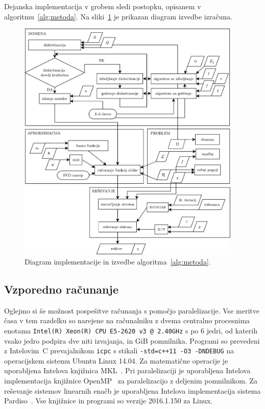 \documentclass[12pt,a4paper,twoside]{article}
\theoremstyle{definition} %
\theoremstyle{plain} %
\numberwithin{equation}{section}
\newcommand{\CC}{C\nolinebreak\hspace{-.05em}\raisebox{.4ex}{\tiny\bf +}\nolinebreak\hspace{-.10em}\raisebox{.4ex}{\tiny\bf +}}
\begin{document}
Dejanska implementacija v grobem sledi postopku, opisanem v algoritmu~\ref{alg:metoda}. Na
sliki~\ref{fig:implementacija} je prikazan diagram izvedbe izračuna.

\begin{figure}[!h]
  \centering
  \vspace{-2ex}
  \includegraphics[width=0.95\textwidth]{images/diagram_finished.pdf}
  \vspace{-1ex}
  \caption[Diagram implementacije in izvedbe MLSM]{Diagram implementacije in
  izvedbe algoritma~\ref{alg:metoda}.}
  \label{fig:implementacija}
  \vspace{-5ex}
\end{figure}

\subsection{Vzporedno računanje}
Oglejmo si še možnost pospešitve računanja s pomočjo paralelizacije.
Vse meritve časa v tem razdelku so narejene na računalniku z dvema centralno procesnima enotama
\texttt{Intel(R) Xeon(R) CPU E5-2620 v3 @ 2.40GHz} s po 6 jedri, od katerih vsako jedro podpira dve
niti izvajanja, in \unit[64]{GiB} pomnilnika. Programi so prevedeni z Intelovim~\CC{}
prevajalnikom \texttt{icpc}  s stikali \texttt{-std=c++11 -O3 -DNDEBUG}
na operacijskem sistemu Ubuntu Linux 14.04. Za matematične operacije je uporabljena Intelova
knjižnica MKL~\cite{mkl}. Pri paralelizaciji je uporabljena Intelova implementacija knjižnice
OpenMP~\cite{dagum1998openmp} za paralelizacijo z deljenim pomnilnikom. Za reševanje sistemov
linearnih enačb je uporabljena Intelova implementacija sistema Pardiso~\cite{pardiso}. Vse
knjižnice in programi so verzije 2016.1.150 za Linux.
\end{document}
